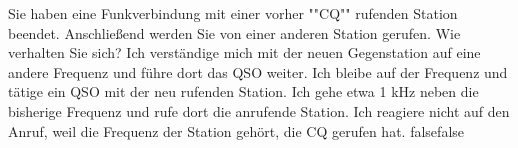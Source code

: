     {Sie haben eine Funkverbindung mit einer vorher ""CQ"" rufenden Station beendet. Anschließend werden Sie von einer anderen Station gerufen. Wie verhalten Sie sich?}
    {Ich verständige mich mit der neuen Gegenstation auf eine andere Frequenz und führe dort das QSO weiter.}
    {Ich bleibe auf der Frequenz und tätige ein QSO mit der neu rufenden Station.}
    {Ich gehe etwa 1 kHz neben die bisherige Frequenz und rufe dort die anrufende Station.}
    {Ich reagiere nicht auf den Anruf, weil die Frequenz der Station gehört, die CQ gerufen hat.}
    {false}{false}